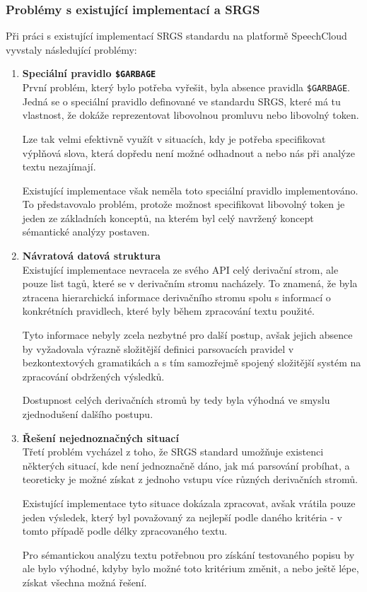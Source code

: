 \subsubsection{Problémy s existující implementací a SRGS}
Při práci s existující implementací SRGS standardu na platformě SpeechCloud~\cite{SpeechCloud.dialog} vyvstaly následující problémy:
\begin{enumerate}
	\item \textbf{Speciální pravidlo \texttt{\$GARBAGE}}\\
	      První problém, který bylo potřeba vyřešit, byla absence pravidla \texttt{\$GARBAGE}.
	      Jedná se o speciální pravidlo definované ve standardu SRGS, které má tu vlastnost, že dokáže reprezentovat libovolnou promluvu nebo libovolný token.

	      Lze tak velmi efektivně využít v situacích, kdy je potřeba specifikovat výplňová slova,
	      která dopředu není možné odhadnout a nebo nás při analýze textu nezajímají.

	      Existující implementace však neměla toto speciální pravidlo implementováno.
	      To představovalo problém, protože možnost specifikovat libovolný token je jeden ze základních konceptů,
	      na kterém byl celý navržený koncept sémantické analýzy postaven.
	\item \textbf{Návratová datová struktura}\\
	      Existující implementace nevracela ze svého API celý derivační strom, ale pouze list tagů, které se v derivačním stromu nacházely.
	      To znamená, že byla ztracena hierarchická informace derivačního stromu spolu s informací o konkrétních pravidlech,
	      které byly během zpracování textu použité.

	      Tyto informace nebyly zcela nezbytné pro další postup, avšak jejich absence by
	      vyžadovala výrazně složitější definici parsovacích pravidel v bezkontextových gramatikách a
	      s tím samozřejmě spojený složitější systém na zpracování obdržených výsledků.

	      Dostupnost celých derivačních stromů by tedy byla výhodná ve smyslu zjednodušení dalšího postupu.
	\item \textbf{Řešení nejednoznačných situací}\\
	      Třetí problém vycházel z toho, že SRGS standard umožňuje existenci některých situací,
	      kde není jednoznačně dáno, jak má parsování probíhat,
	      a teoreticky je možné získat z jednoho vstupu více různých derivačních stromů.


	      Existující implementace tyto situace dokázala zpracovat, avšak vrátila pouze jeden výsledek,
	      který byl považovaný za nejlepší podle daného kritéria - v tomto případě podle délky zpracovaného textu.

	      Pro sémantickou analýzu textu potřebnou pro získání testovaného popisu by ale bylo výhodné,
	      kdyby bylo možné toto kritérium změnit, a nebo ještě lépe, získat všechna možná řešení.
\end{enumerate}

